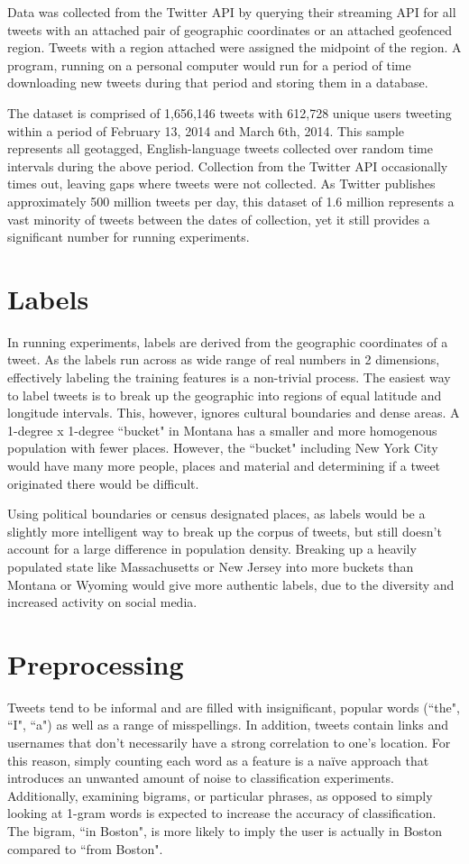 \documentclass[midd]{thesis}
\begin{document}
Data was collected from the Twitter API by querying their streaming API for all tweets with an attached pair of geographic coordinates or an attached geofenced region. Tweets with a region attached were assigned the midpoint of the region. A program, running on a personal computer would run for a period of time downloading new tweets during that period and storing them in a database. 

The dataset is comprised of 1,656,146 tweets with 612,728 unique users tweeting within a period of February 13, 2014 and March 6th, 2014. This sample represents all geotagged, English-language tweets collected over random time intervals during the above period. Collection from the Twitter API occasionally times out, leaving gaps where tweets were not collected. As Twitter publishes approximately 500 million tweets per day, this dataset of 1.6 million represents a vast minority of tweets between the dates of collection, yet it still provides a significant number for running experiments.

\section{Labels}
In running experiments, labels are derived from the geographic coordinates of a tweet. As the labels run across as wide range of real numbers in 2 dimensions, effectively labeling the training features is a non-trivial process. The easiest way to label tweets is to break up the geographic into regions of equal latitude and longitude intervals. This, however, ignores cultural boundaries and dense areas. A 1-degree x 1-degree ``bucket" in Montana has a smaller and more homogenous population with fewer places. However, the ``bucket" including New York City would have many more people, places and material and determining if a tweet originated there would be difficult.

Using political boundaries or census designated places, as labels would be a slightly more intelligent way to break up the corpus of tweets, but still doesn't account for a large difference in population density. Breaking up a heavily populated state like Massachusetts or New Jersey into more buckets than Montana or Wyoming would give more authentic labels, due to the diversity and increased activity on social media.
 
\section{Preprocessing}
Tweets tend to be informal and are filled with insignificant, popular words (``the", ``I", ``a") as well as a range of misspellings. In addition, tweets contain links and usernames that don't necessarily have a strong correlation to one's location. For this reason, simply counting each word as a feature is a naïve approach that introduces an unwanted amount of noise to classification experiments. Additionally, examining bigrams, or particular phrases, as opposed to simply looking at 1-gram words is expected to increase the accuracy of classification. The bigram, ``in Boston", is more likely to imply the user is actually in Boston compared to ``from Boston".
\end{document}
